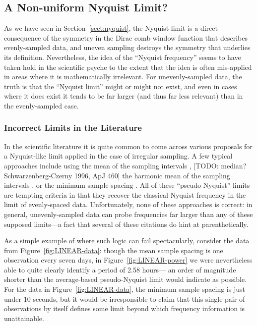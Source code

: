 \documentclass[preprint]{aastex}
\newcommand{\todo}[1]{{\color{red} [TODO: #1]}}
\newcommand{\fig}[1]{Figure~\ref{fig:#1}}
\newcommand{\Sect}[1]{Section~\ref{sect:#1}}
\newcommand{\sect}[1]{\Sect{#1}}
\newcommand{\sectlabel}[1]{\label{sect:#1}}
\begin{document}
\subsection{A Non-uniform Nyquist Limit?}
\sectlabel{pseudo-nyquist}

As we have seen in \sect{nyquist}, the Nyquist limit is a direct consequence
of the symmetry in the Dirac comb window function that describes evenly-sampled data,
and uneven sampling destroys the symmetry that underlies its definition.
Nevertheless, the idea of the ``Nyquist frequency'' seems to have taken hold
in the scientific psyche to the extent that the idea is often mis-applied in
areas where it is mathematically irrelevant.
For unevenly-sampled data, the truth is that the ``Nyquist limit'' might or
might not exist, and even in cases where it does exist it tends to be far
larger (and thus far less relevant) than in the evenly-sampled case.

\subsubsection{Incorrect Limits in the Literature}

In the scientific literature it is quite common to come across various proposals
for a Nyquist-like limit applied in the case of irregular sampling.
A few typical approaches include using the mean of the sampling intervals
\citep[e.g.][]{Scargle82, Horne86, NumRec},
\todo{median? Schwarzenberg-Czerny 1996, ApJ 460}
the harmonic mean of the sampling intervals \citep[e.g.][]{Debosscher07},
or the minimum sample spacing \citep[e.g.][]{Percy86, Roberts87, Press89, Hilditch01}.
All of these ``pseudo-Nyquist'' limits are tempting criteria in that
they recover the classical Nyquist 
frequency in the limit of evenly-spaced data.
Unfortunately, none of these approaches is correct: in general,
unevenly-sampled data can probe frequencies far larger than any of these
supposed limits---a fact that several of these citations do hint at
parenthetically.

As a simple example of where such logic can fail spectacularly,
consider the data from \fig{LINEAR-data}: though the mean sample
spacing is one observation every seven days, in \fig{LINEAR-power}
we were nevertheless able to quite clearly identify a period of 2.58 hours---
an order of magnitude shorter than the average-based pseudo-Nyquist limit
would indicate as possible.
For the data in \fig{LINEAR-data}, the minimum sample spacing is just under 10
seconds, but it would be irresponsible to claim that this single pair of
observations by itself defines some limit beyond which frequency information
is unattainable.
\end{document}
